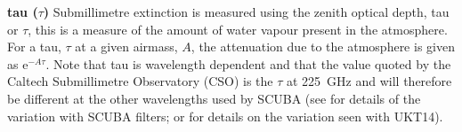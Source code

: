 \documentclass[twoside,11pt]{article}
\newcommand{\htmladdnormallink}[2]{#1}
\renewcommand{\_}{\texttt{\symbol{95}}}
\begin{document}
\begin{description}
\item{{\bf tau ($\tau$)}} Submillimetre extinction is measured using the
zenith optical depth, tau or $\tau$, this is a measure of the amount of water
vapour present in the atmosphere. For a tau, $\tau$ at a given airmass, $A$,
the attenuation due to the atmosphere is given as e$^{-A \tau}$. Note that tau
is wavelength dependent and that the value quoted by the 
\htmladdnormallink{Caltech Submillimetre Observatory}{http://www.cco.caltech.edu/\~{}cso/} (CSO) is the $\tau$ at 225~GHz and will therefore be different at
the other wavelengths used by SCUBA (see \cite{ENA} for details of the
variation with SCUBA filters; or \cite{SR94} for details on the
variation seen with UKT14).

\end{description}

\clearpage
\end{document}
